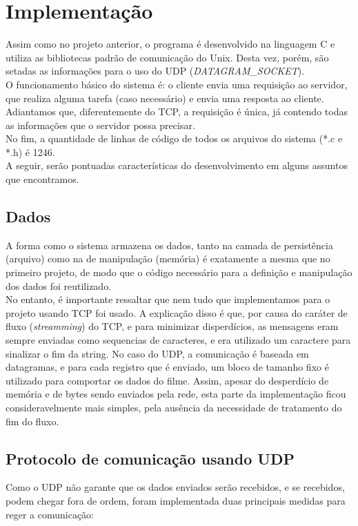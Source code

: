 \documentclass[11pt,twoside]{article}
\begin{document}
\section{Implementação}
Assim como no projeto anterior, o programa é desenvolvido na linguagem C e utiliza as bibliotecas padrão de comunicação do Unix. Desta vez, porém, são setadas as informações para o uso do UDP (\textit{DATAGRAM\_SOCKET}).\\
O funcionamento básico do sistema é: o cliente envia uma requisição ao servidor, que realiza alguma tarefa (caso necessário) e envia uma resposta ao cliente. Adiantamos que, diferentemente do TCP, a requisição é única, já contendo todas as informações que o servidor possa precisar.\\
No fim, a quantidade de linhas de código de todos os arquivos do sistema (*.c e *.h) é 1246.\\
A seguir, serão pontuadas características do desenvolvimento em alguns assuntos que encontramos.\\

\subsection{Dados}
A forma como o sistema armazena os dados, tanto na camada de persistência (arquivo) como na de manipulação (memória) é exatamente a mesma que no primeiro projeto, de modo que o código necessário para a definição e manipulação dos dados foi reutilizado.\\
No entanto, é importante ressaltar que nem tudo que implementamos para o projeto usando TCP foi usado. A explicação disso é que, por causa do caráter de fluxo (\textit{streamming}) do TCP, e para minimizar disperdícios, as mensagens eram sempre enviadas como sequencias de caracteres, e era utilizado um caractere para sinalizar o fim da string. No caso do UDP, a comunicação é baseada em datagramas, e para cada registro que é enviado, um bloco de tamanho fixo é utilizado para comportar os dados do filme. Assim, apesar do desperdício de memória e de bytes sendo enviados pela rede, esta parte da implementação ficou consideravelmente mais simples, pela ausência da necessidade de tratamento do fim do fluxo.\\

\subsection{Protocolo de comunicação usando UDP}
Como o UDP não garante que os dados enviados serão recebidos, e se recebidos, podem chegar fora de ordem, foram implementada duas principais medidas para reger a comunicação:
\end{document}

